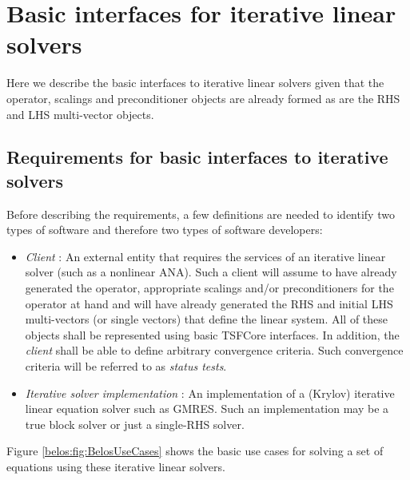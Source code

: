 \documentclass[pdf,ps2pdf,11pt]{SANDreport}
\begin{document}
\section{Basic interfaces for iterative linear solvers}

Here we describe the basic interfaces to iterative linear solvers
given that the operator, scalings and preconditioner objects are
already formed as are the RHS and LHS multi-vector objects.

\subsection{Requirements for basic interfaces to iterative solvers}

Before describing the requirements, a few definitions are needed to
identify two types of software and therefore two types of software
developers:

\begin{itemize}

\item{}\textit{Client} :
An external entity that requires the services of an iterative linear
solver (such as a nonlinear ANA).  Such a client will assume to have
already generated the operator, appropriate scalings and/or
preconditioners for the operator at hand and will have already
generated the RHS and initial LHS multi-vectors (or single vectors)
that define the linear system.  All of these objects shall be
represented using basic TSFCore interfaces.  In addition, the
{}\textit{client} shall be able to define arbitrary convergence
criteria.  Such convergence criteria will be referred to as
{}\textit{status tests}.

\item{}\textit{Iterative solver implementation} : 
An implementation of a (Krylov) iterative linear equation solver such
as GMRES.  Such an implementation may be a true block solver or just a
single-RHS solver.

\end{itemize}

Figure {}\ref{belos:fig:BelosUseCases} shows the basic use cases for
solving a set of equations using these iterative linear solvers.
\end{document}
